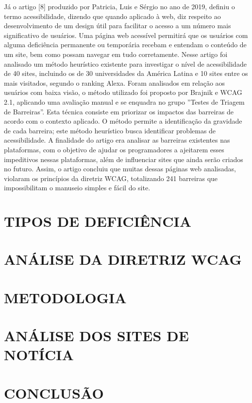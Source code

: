 \documentclass[a4paper]{article}
\begin{document}
\begin{titlepage}
Já o artigo [8] produzido por Patricia, Luis e Sérgio no ano de 2019, definiu o termo acessibilidade, dizendo que quando aplicado à web, diz respeito ao desenvolvimento de um design útil para facilitar o acesso a um número mais significativo de usuários. Uma página web acessível permitirá que os usuários com alguma deficiência permanente ou temporária recebam e entendam o conteúdo de um site, bem como possam navegar em tudo corretamente. Nesse artigo foi analisado um método heurístico existente para investigar o nível de acessibilidade de 40 sites, incluindo os de 30 universidades da América Latina e 10 sites entre os mais visitados, segundo o ranking Alexa. Foram analisados em relação aos usuários com baixa visão, o método utilizado foi proposto por Brajnik e WCAG 2.1, aplicando uma avaliação manual e se enquadra no grupo ''Testes de Triagem de Barreiras''. Esta técnica consiste em priorizar os impactos das barreiras de acordo com o contexto aplicado. O método permite a identificação da gravidade de cada barreira; este método heurístico busca identificar problemas de acessibilidade. A finalidade do artigo era analisar as barreiras existentes nas plataformas, com o objetivo de ajudar os programadores a ajeitarem esses impeditivos nessas plataformas, além de influenciar sites que ainda serão criados no futuro. Assim, o artigo concluiu que muitas dessas páginas web analisadas, violaram os princípios da diretriz WCAG, totalizando 241 barreiras que impossibilitam o manuseio simples e fácil do site.

\section{TIPOS DE DEFICIÊNCIA}
\section{ANÁLISE DA DIRETRIZ WCAG}
\section{METODOLOGIA}
\section{ANÁLISE DOS SITES DE NOTÍCIA}
\section{CONCLUSÃO}

\end{titlepage}
\end{document}
